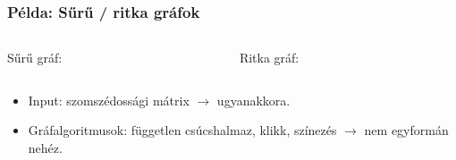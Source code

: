\begin{frame}
\begin{footnotesize}
\frametitle{Példa: Sűrű / ritka gráfok}

\begin{columns}
\begin{column}{0.5\textwidth}
Sűrű gráf:

\end{column}

\begin{column}{0.5\textwidth}
Ritka gráf:

\end{column}
\end{columns}

\begin{itemize}
\item Input: szomszédossági mátrix $\rightarrow$ ugyanakkora.
\item Gráfalgoritmusok: független csúcshalmaz, klikk, színezés $\rightarrow$ nem egyformán nehéz.
\end{itemize}

\end{footnotesize}
\end{frame}

